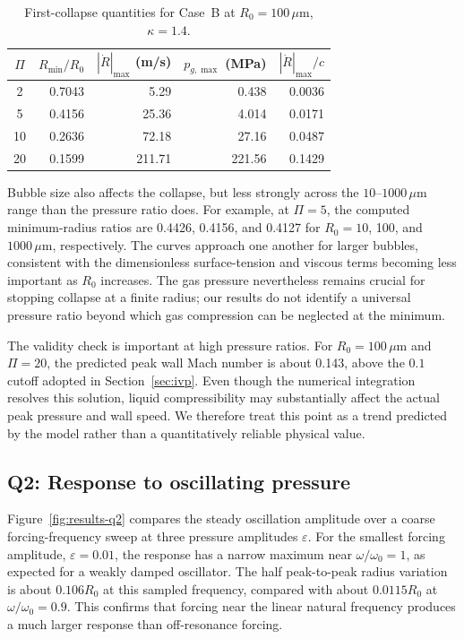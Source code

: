 \begin{table}[htbp]
\centering
\small
\begin{tabular}{c|rrrr}
\hline
$\Pi$ & $R_{\min}/R_0$ & $|\dot R|_{\max}$ (m/s) & $p_{g,\max}$ (MPa) & $|\dot R|_{\max}/c$ \\
\hline
2  & 0.7043 & 5.29   & 0.438 & 0.0036 \\
5  & 0.4156 & 25.36  & 4.014 & 0.0171 \\
10 & 0.2636 & 72.18  & 27.16 & 0.0487 \\
20 & 0.1599 & 211.71 & 221.56 & 0.1429 \\
\hline
\end{tabular}
\caption{First-collapse quantities for Case~B at $R_0=100\,\mu\mathrm{m}$, $\kappa=1.4$.}
\label{tab:results-q1}
\end{table}

Bubble size also affects the collapse, but less strongly across the $10$--$1000\,\mu\mathrm{m}$ range than the pressure ratio does. For example, at $\Pi=5$, the computed minimum-radius ratios are 0.4426, 0.4156, and 0.4127 for $R_0=10$, 100, and $1000\,\mu\mathrm{m}$, respectively. The curves approach one another for larger bubbles, consistent with the dimensionless surface-tension and viscous terms becoming less important as $R_0$ increases. The gas pressure nevertheless remains crucial for stopping collapse at a finite radius; our results do not identify a universal pressure ratio beyond which gas compression can be neglected at the minimum.

The validity check is important at high pressure ratios. For $R_0=100\,\mu\mathrm{m}$ and $\Pi=20$, the predicted peak wall Mach number is about 0.143, above the $0.1$ cutoff adopted in Section~\ref{sec:ivp}. Even though the numerical integration resolves this solution, liquid compressibility may substantially affect the actual peak pressure and wall speed. We therefore treat this point as a trend predicted by the model rather than a quantitatively reliable physical value.

\subsection{Q2: Response to oscillating pressure}
\label{sec:results-q2}

Figure~\ref{fig:results-q2} compares the steady oscillation amplitude over a coarse forcing-frequency sweep at three pressure amplitudes $\varepsilon$. For the smallest forcing amplitude, $\varepsilon=0.01$, the response has a narrow maximum near $\omega/\omega_0=1$, as expected for a weakly damped oscillator. The half peak-to-peak radius variation is about $0.106R_0$ at this sampled frequency, compared with about $0.0115R_0$ at $\omega/\omega_0=0.9$. This confirms that forcing near the linear natural frequency produces a much larger response than off-resonance forcing.

